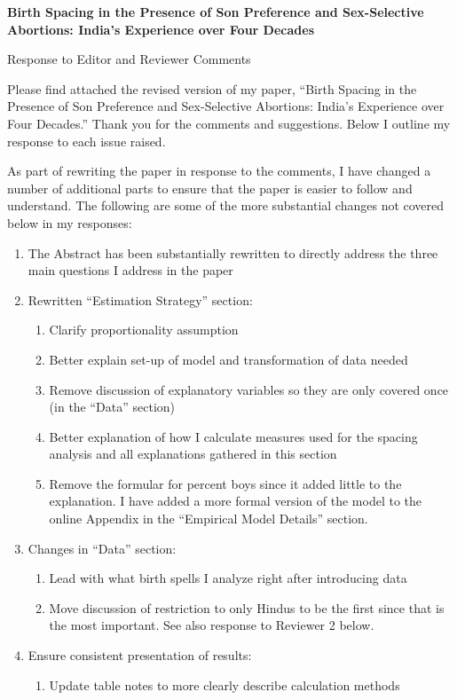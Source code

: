\documentclass[letterpaper,12pt]{article}
\title{} \author{}
\begin{document}
\begin{center} \textbf{\large Birth Spacing in the Presence of Son
Preference and 
Sex-Selective Abortions: India's Experience over Four Decades}
\end{center}

\begin{center} Response to Editor and Reviewer Comments \end{center}

\noindent Please find attached the revised version of my paper,
``Birth Spacing in the Presence of Son Preference and Sex-Selective
Abortions: India's Experience over Four Decades.''
Thank you for the comments and suggestions. 
Below I outline my response to each issue raised.


As part of rewriting the paper in response to the comments, I have changed a number of 
additional parts to ensure that the paper is easier to follow and understand.
The following are some of the more substantial changes not covered below in my responses:
\begin{enumerate}
    \item The Abstract has been substantially rewritten to directly address the three
    main questions I address in the paper
	\item Rewritten ``Estimation Strategy'' section:
	\begin{enumerate}
		\item Clarify proportionality assumption
		\item Better explain set-up of model and transformation of data needed
		\item Remove discussion of explanatory variables so they are
		only covered once (in the ``Data'' section)
		\item Better explanation of how I calculate measures used for the spacing
		analysis and all explanations gathered in this section
		\item Remove the formular for percent boys since it added little to the
		explanation. 
		I have added a more formal version of the model to the online Appendix in the
		``Empirical Model Details'' section.
	\end{enumerate}
	\item Changes in ``Data'' section:
	\begin{enumerate}
		\item Lead with what birth spells I analyze right after introducing
		data
		\item Move discussion of restriction to only Hindus to be the first since that is 
		the most important. 
		See also response to Reviewer 2 below.
	\end{enumerate}
	\item Ensure consistent presentation of results:
	\begin{enumerate}
		\item Update table notes to more clearly describe calculation methods
	\end{enumerate}
\end{enumerate}
\end{document}
